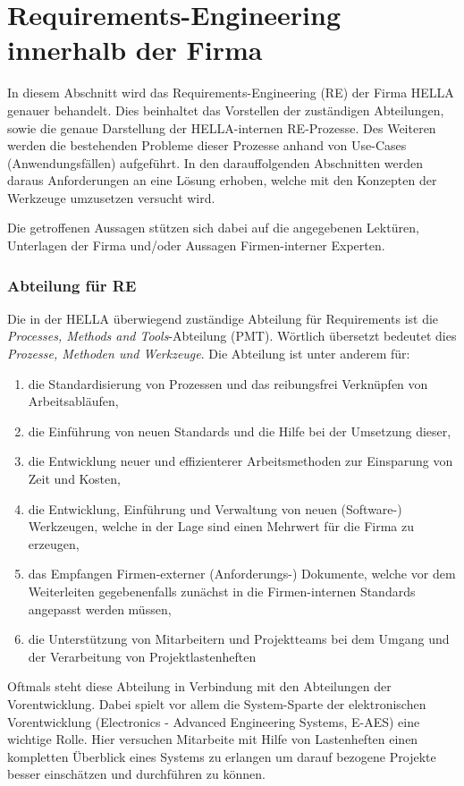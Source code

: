 \documentclass[12pt]{report}
\begin{document}
\section[RE bei HELLA]{Requirements-Engineering innerhalb der Firma}
In diesem Abschnitt wird das Requirements-Engineering (RE) der Firma HELLA genauer behandelt. Dies beinhaltet das Vorstellen der zuständigen Abteilungen, sowie die genaue Darstellung der HELLA-internen RE-Prozesse. Des Weiteren werden die bestehenden Probleme dieser Prozesse anhand von Use-Cases (Anwendungsfällen) aufgeführt. In den darauffolgenden Abschnitten werden daraus Anforderungen an eine Lösung erhoben, welche mit den Konzepten der Werkzeuge umzusetzen versucht wird.

Die getroffenen Aussagen stützen sich dabei auf die angegebenen Lektüren, Unterlagen der Firma und/oder Aussagen Firmen-interner Experten. 
\subsubsection{Abteilung für RE}
Die in der HELLA überwiegend zuständige Abteilung für Requirements ist die \textit{Processes, Methods and Tools}-Abteilung (PMT). Wörtlich übersetzt bedeutet dies \textit{Prozesse, Methoden und Werkzeuge}. Die Abteilung ist unter anderem für: 
\begin{enumerate}
\item die Standardisierung von Prozessen und das reibungsfrei Verknüpfen von Arbeitsabläufen,
\item die Einführung von neuen Standards und die Hilfe bei der Umsetzung dieser,
\item die Entwicklung neuer und effizienterer Arbeitsmethoden zur Einsparung von Zeit und Kosten,
\item die Entwicklung, Einführung und Verwaltung von neuen (Software-) Werkzeugen, welche in der Lage sind einen Mehrwert für die Firma zu erzeugen,
\item das Empfangen Firmen-externer (Anforderungs-) Dokumente, welche vor dem Weiterleiten gegebenenfalls zunächst in die Firmen-internen Standards angepasst werden müssen, 
\item die Unterstützung von Mitarbeitern und Projektteams bei dem Umgang und der Verarbeitung von Projektlastenheften
\end{enumerate}

Oftmals steht diese Abteilung in Verbindung mit den Abteilungen der Vorentwicklung. Dabei spielt vor allem die System-Sparte der elektronischen Vorentwicklung (Electronics - Advanced Engineering Systems, E-AES) eine wichtige Rolle. Hier versuchen Mitarbeite mit Hilfe von Lastenheften einen kompletten Überblick eines Systems zu erlangen um darauf bezogene Projekte besser einschätzen und durchführen zu können. 
\end{document}
